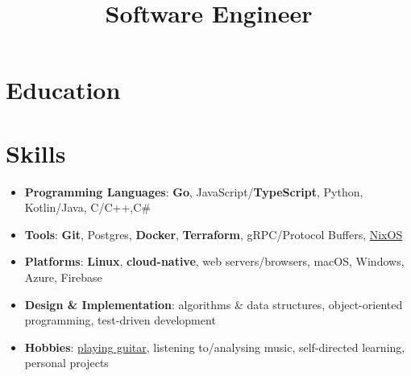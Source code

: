 \documentclass[
	a4paper,
	10pt,
	roman,
	colorlinks,
	linkcolor = purple,
	filecolor = purple,
	citecolor = blue,
	urlcolor = blue
]{moderncv}
\title{Software Engineer}
\begin{document}
	\maketitle
	\section{Education}

	\section{Skills}\label{sec:skills}
	\begin{itemize}
		\item \textbf{Programming Languages}: \textbf{Go}, JavaScript/\textbf{TypeScript}, Python, Kotlin/Java, C/C++,C\#
		\item \textbf{Tools}: \textbf{Git}, Postgres, \textbf{Docker}, \textbf{Terraform}, gRPC/Protocol Buffers, \href{https://nixos.org}{NixOS}
		\item \textbf{Platforms}: \textbf{Linux}, \textbf{cloud-native}, web servers/browsers, macOS, Windows, Azure, Firebase
		\item \textbf{Design \& Implementation}: algorithms \& data structures, object-oriented programming, test-driven development
		\item \textbf{Hobbies}: \href{https://applegamer22.github.io/about/#hobbies}{playing guitar}, listening to/analysing music, self-directed learning, personal projects
	\end{itemize}
\end{document}
